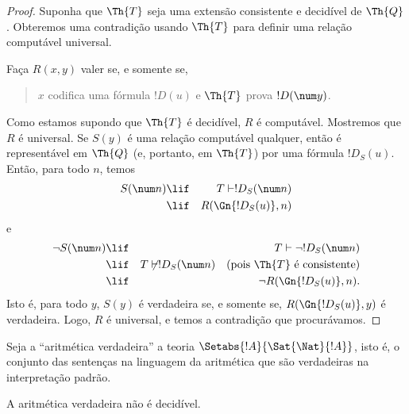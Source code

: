 \documentclass[../../../include/open-logic-section]{subfiles}
\begin{document}
\begin{proof}
Suponha que $\Th{T}$ seja uma extensão consistente e decidível de
$\Th{Q}$. Obteremos uma contradição usando $\Th{T}$ para definir uma
relação computável universal.

Faça $R(x,y)$ valer se, e somente se,
\begin{quote}
$x$ codifica uma fórmula $!D(u)$ e $\Th{T}$ prova $!D(\num y)$.
\end{quote}
Como estamos supondo que $\Th{T}$ é decidível, $R$ é computável.
Mostremos que $R$ é universal. Se $S(y)$ é uma relação computável
qualquer, então é representável em $\Th{Q}$ (e, portanto, em $\Th{T}$)
por uma fórmula $!D_S(u)$. Então, para todo $n$, temos
\begin{eqnarray*}
S(\num n) & \lif & T \vdash !D_S(\num n) \\
& \lif & R(\Gn{!D_S(u)}, n)
\end{eqnarray*}
e
\begin{eqnarray*}
\lnot S(\num n) & \lif & T \vdash \lnot !D_S(\num n) \\
& \lif & T \not\vdash !D_S(\num n) \quad \text{(pois $\Th{T}$ é
  consistente)} \\
& \lif & \lnot R(\Gn{!D_S(u)}, n).
\end{eqnarray*}
Isto é, para todo $y$, $S(y)$ é verdadeira se, e somente se,
$R(\Gn{!D_S(u)}, y)$ é verdadeira. Logo, $R$ é universal, e temos a
contradição que procurávamos.
\end{proof}

Seja a ``aritmética verdadeira'' a teoria
$\Setabs{!A}{ \Sat{\Nat}{!A}}$, isto é, o conjunto das sentenças na
linguagem da aritmética que são verdadeiras na interpretação padrão.

\begin{cor}
A aritmética verdadeira não é decidível.
\end{cor}

\end{document}
